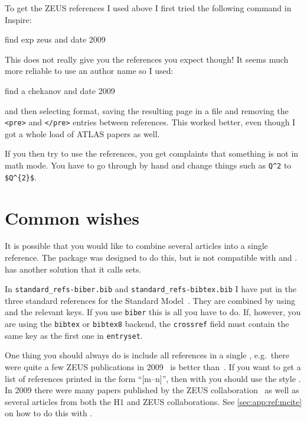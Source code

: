 To get the ZEUS references I used above I first tried the following
command in Inspire:
\begin{bashlisting}
find exp zeus and date 2009
\end{bashlisting}
This does not really give you the references you expect though! It
seems much more reliable to use an author name so I used:
\begin{bashlisting}
find a chekanov and date 2009
\end{bashlisting}
and then selecting \BibTeX{} format, saving the resulting page in a file
and removing the \texttt{<pre>} and \texttt{</pre>} entries between
references. This worked better, even though I got a whole load of
ATLAS papers as well.

If you then try to use the references, you get complaints that
something is not in math mode. You have to go through by hand and
change things such as \verb+Q^2+ to \verb+$Q^{2}$+.


\section{Common wishes}%
\label{sec:ref:tips}

It is possible that you would like to combine several articles into a
single reference. The  package was designed to do this,
but is not compatible with  and
.  has another solution that it
calls sets.

In \texttt{standard\_refs-biber.bib} and
\texttt{standard\_refs-bibtex.bib} I have put in the three standard
references for the Standard Model~\cite{gsw}. They are combined by
using  and the relevant keys.
If you use \texttt{biber} this is all you have to do.
If, however, you are using the \texttt{bibtex} or \texttt{bibtex8} backend, 
the \texttt{crossref} field must contain the same key as the first one in
\texttt{entryset}.

One thing you should always do is include all references in a single
, e.g.\ there were quite a few ZEUS publications in
2009~\cite{Chekanov:2009qja,Chekanov:2009zz,Chekanov:2009tu} is better
than~\cite{Chekanov:2009qja}\cite{Chekanov:2009zz}\cite{Chekanov:2009tu}.
If you want to get a list of references printed in the form \enquote{[m--n]},
then with  you should use the style
. In 2009 there were many papers published by the
ZEUS
collaboration~\cite{Chekanov:2009qja,Chekanov:2009zz,Chekanov:2009tu}
as well as several articles from both the H1 and ZEUS
collaborations\cite{Chekanov:2009wt,Aaron:2009wg}.
See \cref{sec:app:ref:mcite} on how to do this with \BibTeX.

